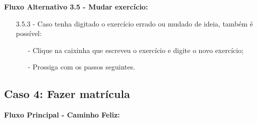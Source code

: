 \documentclass{article}
\begin{document}
    \textbf{Fluxo Alternativo 3.5 - Mudar exercício:}

    \begin{itemize}
        \item[3.5.3 -] Caso tenha digitado o exercício errado ou mudado de ideia, também é possível:
        
         \begin{itemize}
             \item[-] Clique na caixinha que escreveu o exercício e digite o novo exercício;
             \item[-] Prossiga com os passos seguintes.
         \end{itemize}
    \end{itemize}

\subsection{Caso 4: Fazer matrícula}

    \textbf{Fluxo Principal - Caminho Feliz:} \\
\end{document}
